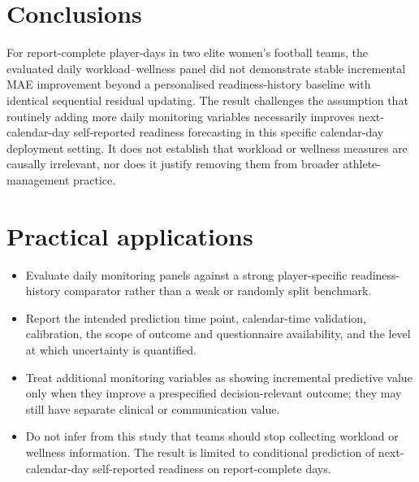 \section{Conclusions}
For report-complete player-days in two elite women's football teams, the evaluated daily workload--wellness panel did not demonstrate stable incremental MAE improvement beyond a personalised readiness-history baseline with identical sequential residual updating. The result challenges the assumption that routinely adding more daily monitoring variables necessarily improves next-calendar-day self-reported readiness forecasting in this specific calendar-day deployment setting. It does not establish that workload or wellness measures are causally irrelevant, nor does it justify removing them from broader athlete-management practice.

\section*{Practical applications}
\begin{itemize}
\item Evaluate daily monitoring panels against a strong player-specific readiness-history comparator rather than a weak or randomly split benchmark.
\item Report the intended prediction time point, calendar-time validation, calibration, the scope of outcome and questionnaire availability, and the level at which uncertainty is quantified.
\item Treat additional monitoring variables as showing incremental predictive value only when they improve a prespecified decision-relevant outcome; they may still have separate clinical or communication value.
\item Do not infer from this study that teams should stop collecting workload or wellness information. The result is limited to conditional prediction of next-calendar-day self-reported readiness on report-complete days.
\end{itemize}

